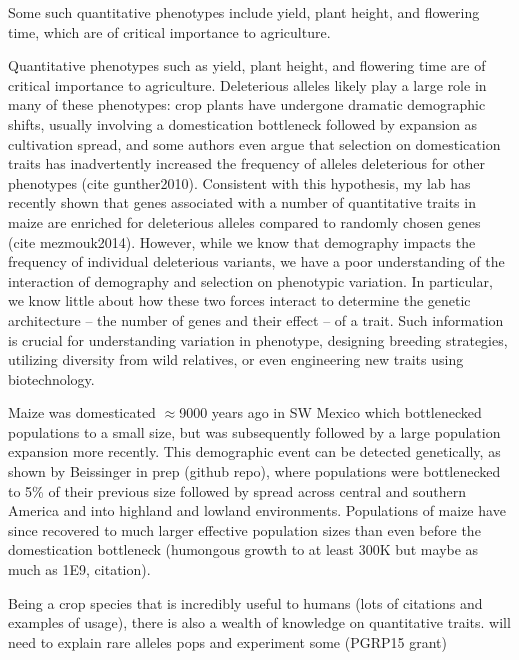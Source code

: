 Some such quantitative phenotypes include yield, plant height, and flowering time, which are of critical importance to agriculture.  

Quantitative phenotypes such as yield, plant height, and flowering time are of critical importance to agriculture.  
Deleterious alleles likely play a large role in many of these phenotypes: crop plants have undergone dramatic demographic shifts, usually involving a domestication bottleneck followed by expansion as cultivation spread, and some authors even argue that selection on domestication traits has inadvertently increased the frequency of alleles deleterious for other phenotypes (cite gunther2010). 
Consistent with this hypothesis, my lab has recently shown that genes associated with a number of quantitative traits in maize are enriched for deleterious alleles  compared to randomly chosen genes (cite mezmouk2014).
However, while we know that demography impacts the frequency of individual deleterious variants, we have a poor understanding of the interaction of demography and selection on phenotypic variation. 
In particular, we know little about how these two forces interact to determine the genetic architecture -- the number of genes and their effect -- of a trait. 
Such information is crucial for understanding variation in phenotype, designing breeding strategies, utilizing diversity from wild relatives, or even engineering new traits using biotechnology. 

	

Maize was domesticated $\approx$9000 years ago in SW Mexico which bottlenecked populations to a small size, but was subsequently followed by a large population expansion more recently. This demographic event can be detected genetically, as shown by Beissinger in prep (github repo), where populations were bottlenecked to 5\% of their previous size followed by spread across central and southern America and into highland and lowland environments. Populations of maize have since recovered to much larger effective population sizes than even before the domestication bottleneck (humongous growth to at least 300K but maybe as much as 1E9, citation).

Being a crop species that is incredibly useful to humans (lots of citations and examples of usage), there is also a wealth of knowledge on quantitative traits. 
will need to explain rare alleles pops and experiment some (PGRP15 grant)

